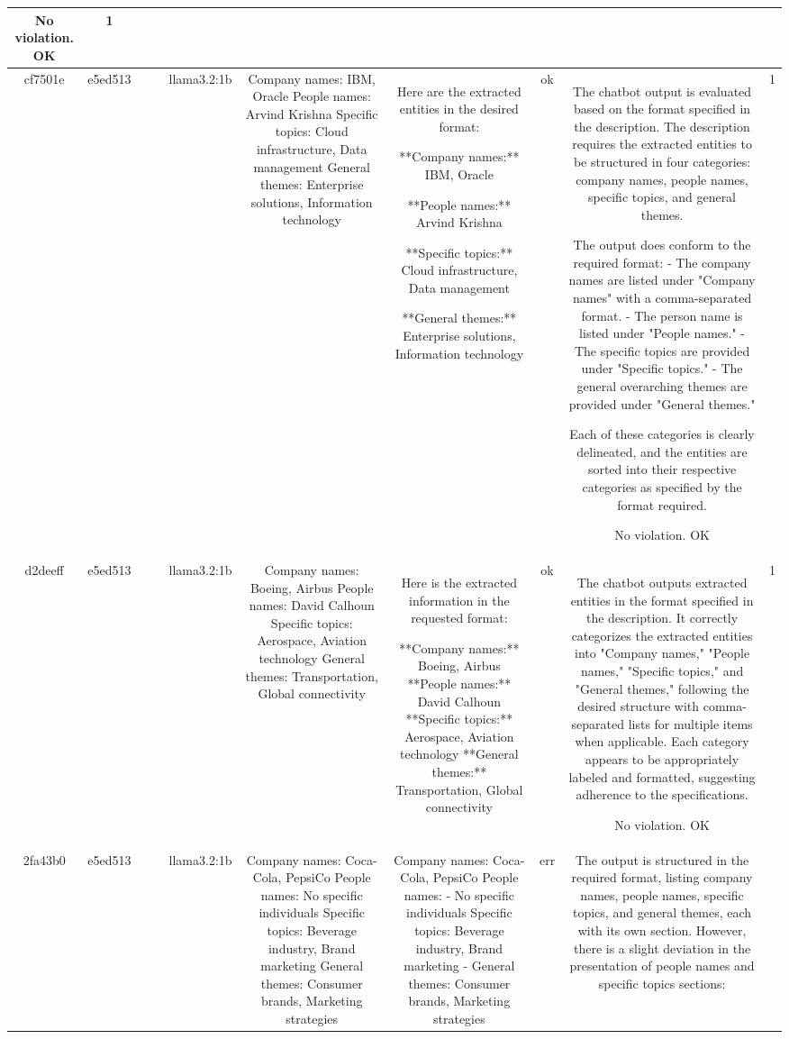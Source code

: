 \begin{table}[h!]
\begin{tabular}{|c|c|c|c|c|c|c|c|c|c|}
No violation.
OK & 1\\
\hline
cf7501e & e5ed513 &  &  & llama3.2:1b & Company names: IBM, Oracle
People names: Arvind Krishna
Specific topics: Cloud infrastructure, Data management
General themes: Enterprise solutions, Information technology & Here are the extracted entities in the desired format:

**Company names:** IBM, Oracle

**People names:** Arvind Krishna

**Specific topics:** Cloud infrastructure, Data management

**General themes:** Enterprise solutions, Information technology & ok & The chatbot output is evaluated based on the format specified in the description. The description requires the extracted entities to be structured in four categories: company names, people names, specific topics, and general themes.

The output does conform to the required format:
- The company names are listed under "Company names" with a comma-separated format.
- The person name is listed under "People names."
- The specific topics are provided under "Specific topics."
- The general overarching themes are provided under "General themes."

Each of these categories is clearly delineated, and the entities are sorted into their respective categories as specified by the format required.

No violation.
OK & 1\\
\hline
d2deeff & e5ed513 &  &  & llama3.2:1b & Company names: Boeing, Airbus
People names: David Calhoun
Specific topics: Aerospace, Aviation technology
General themes: Transportation, Global connectivity & Here is the extracted information in the requested format:

**Company names:** Boeing, Airbus
**People names:** David Calhoun
**Specific topics:** Aerospace, Aviation technology
**General themes:** Transportation, Global connectivity & ok & The chatbot outputs extracted entities in the format specified in the description. It correctly categorizes the extracted entities into "Company names," "People names," "Specific topics," and "General themes," following the desired structure with comma-separated lists for multiple items when applicable. Each category appears to be appropriately labeled and formatted, suggesting adherence to the specifications.

No violation.
OK & 1\\
\hline
2fa43b0 & e5ed513 &  &  & llama3.2:1b & Company names: Coca-Cola, PepsiCo
People names: No specific individuals
Specific topics: Beverage industry, Brand marketing
General themes: Consumer brands, Marketing strategies & Company names: Coca-Cola, PepsiCo
People names: 
- No specific individuals
Specific topics: Beverage industry, Brand marketing
- General themes: Consumer brands, Marketing strategies & err & The output is structured in the required format, listing company names, people names, specific topics, and general themes, each with its own section. However, there is a slight deviation in the presentation of people names and specific topics sections:


\end{tabular}
\end{table}
